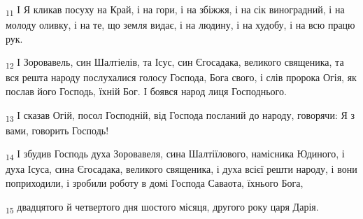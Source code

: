 \begin{tcolorbox}
\textsubscript{11} І Я кликав посуху на Край, і на гори, і на збіжжя, і на сік виноградний, і на молоду оливку, і на те, що земля видає, і на людину, і на худобу, і на всю працю рук.
\end{tcolorbox}
\begin{tcolorbox}
\textsubscript{12} І Зоровавель, син Шалтіелів, та Ісус, син Єгосадака, великого священика, та вся решта народу послухалися голосу Господа, Бога свого, і слів пророка Огія, як послав його Господь, їхній Бог. І боявся народ лиця Господнього.
\end{tcolorbox}
\begin{tcolorbox}
\textsubscript{13} І сказав Огій, посол Господній, від Господа посланий до народу, говорячи: Я з вами, говорить Господь!
\end{tcolorbox}
\begin{tcolorbox}
\textsubscript{14} І збудив Господь духа Зоровавеля, сина Шалтіїлового, намісника Юдиного, і духа Ісуса, сина Єгосадака, великого священика, і духа всієї решти народу, і вони поприходили, і зробили роботу в домі Господа Саваота, їхнього Бога,
\end{tcolorbox}
\begin{tcolorbox}
\textsubscript{15} двадцятого й четвертого дня шостого місяця, другого року царя Дарія.
\end{tcolorbox}
